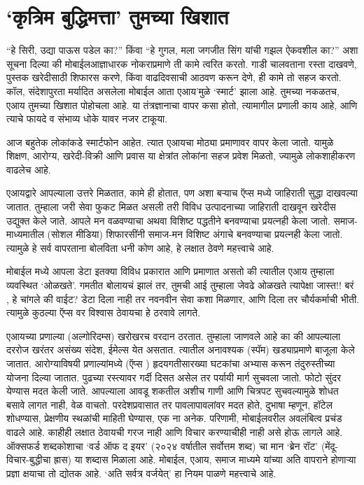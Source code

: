 \chapter{`कृत्रिम बुद्धिमत्ता' तुमच्या खिशात}

``हे सिरी, उद्या पाऊस पडेल का?'' किंवा ``हे गुगल, मला जगजीत सिंग यांची गझल ऐकवशील का?'' अशा सूचना दिल्या की मोबाईलआज्ञाधारक नोकराप्रमाणे ती कामे त्वरित करतो. गाडी चालवताना रस्ता दाखवणे, पुस्तक खरेदीसाठी शिफारस करणे, किंवा वाढदिवसाची आठवण करून देणे, ही कामे तो सहज करतो. कॉल, संदेशापुरता मर्यादित असलेला मोबाईल आता एआय'मुळे `स्मार्ट' झाला आहे. तुमच्या नकळतच, एआय तुमच्या खिशात पोहोचला आहे. या तंत्रज्ञानाचा वापर कसा होतो, त्यामागील प्रणाली काय आहे, आणि त्याचे फायदे व संभाव्य धोके यावर नजर टाकूया.

आज बहुतेक लोकांकडे स्मार्टफोन आहेत. त्यात एआयचा मोठ्या प्रमाणावर वापर केला जातो. यामुळे शिक्षण, आरोग्य, खरेदी-विक्री आणि प्रवास या क्षेत्रांत लोकांना सहज प्रवेश मिळतो, ज्यामुळे लोकशाहीकरण वाढलेच आहे.

एआयद्वारे आपल्याला उत्तरे मिळतात, कामे ही होतात, पण अशा बऱ्याच ऍप्स मध्ये जाहिराती सुद्धा दाखवल्या जातात. तुम्हाला जरी सेवा फुकट मिळत असली तरी विविध उत्पादनाच्या जाहिराती दाखवून खरेदीस उद्युक्त केले जाते. आपले मन वळवण्याचा अथवा विशिष्ट पद्धतीने बनवण्याचा प्रयत्नही केला जातो. समाज-माध्यमातील (सोशल मीडिया) शिफारसींनी समाज-मन विशिष्ट अंगाचे बनवण्याचा प्रयत्नही केला जातो. त्यामुळे हे सर्व वापरताना बोलविता धनी कोण आहे, हे लक्षात ठेवणे महत्त्वाचे आहे.

मोबाईल मध्ये आपला डेटा इतक्या विविध प्रकारात आणि प्रमाणात असतो की त्यातील एआय तुम्हाला व्यवस्थित `ओळखते'. गमतीत बोलायचं झालं तर, तुमची आई तुम्हाला जेवढे ओळखते त्यापेक्षा जास्त!! बरं , हे चांगले की वाईट? डेटा दिला नाही तर नवनवीन सेवा कशा मिळणार, आणि दिला तर चौर्यकर्माची भीती. त्यामुळे कुठल्या ऍप्स वर विश्वास ठेवायचा हे ठरवावे लागते.

एआयच्या प्रणाल्या (अल्गोरिदम्स) खरोखरच वरदान ठरतात. तुम्हाला जाणवले आहे का की आपल्याला दररोज खरंतर असंख्य संदेश, ईमेल्स येत असतात. त्यातील अनावश्यक (स्पॅम) खड्याप्रमाणे बाजूला केले जातात. आरोग्याविषयी प्रणाल्यांमध्ये (ऍप्स ) हृदयगतीसारख्या घटकांचा अभ्यास करून तंदुरुस्तीच्या योजना दिल्या जातात. पुढच्या रस्त्यावर गर्दी दिसत असेल तर पर्यायी मार्ग सुचवला जातो. फोटो सुंदर येण्यास मदत केली जाते. आपल्याला आवडू शकतील अशीच गाणी आणि चित्रपट सुचवल्यामुळे शोधत बसावे लागत नाही, वेळ वाचतो. परदेशप्रवासात तर पावलापावलांवर मदत होते, दुभाषा म्हणून, हॉटेल शोधण्यास, प्रेक्षणीय स्थळांची माहिती घेण्यास, एक ना अनेक. परिणामी, मोबाईलवरील अवलंबित्व प्रचंड वाढले आहे. काहीही लक्षात ठेवायची गरज नाही आणि विचार करण्याचीही नाही असे होऊ लागले आहे. ऑक्सफर्ड शब्दकोशाचा `वर्ड ऑफ द इयर' (२०२४ वर्षातील सर्वोत्तम शब्द) चा मान `ब्रेन रॉट' (मेंदू-विचार-बुद्धीचा ह्रास) या शब्दास मिळाला आहे. मोबाईल, एआय, समाज माध्यमे यांच्या अति वापराने होणाऱ्या प्रज्ञा क्षयाचा तो द्योतक आहे. `अति सर्वत्र वर्जयेत्' हा नियम पाळणे महत्त्वाचे आहे.

